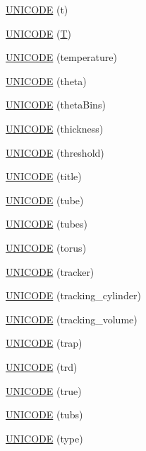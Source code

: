 \begin{DoxyCompactItemize}
\item 
\hyperlink{namespace_d_d4hep_1_1_x_m_l_a988d89cf2c203a2dcab17dcdd2b646e9}{UNICODE} (t)
\item 
\hyperlink{namespace_d_d4hep_1_1_x_m_l_ae77633b9569ec50bee3f73593ec8a980}{UNICODE} (\hyperlink{class_t}{T})
\item 
\hyperlink{namespace_d_d4hep_1_1_x_m_l_aee923e97c96d6ce85da79a35da8fc126}{UNICODE} (temperature)
\item 
\hyperlink{namespace_d_d4hep_1_1_x_m_l_a8b7e23c0e5c06deb75db701712e98cdd}{UNICODE} (theta)
\item 
\hyperlink{namespace_d_d4hep_1_1_x_m_l_a60d1fee6ef14e9212445fa1b817b0651}{UNICODE} (thetaBins)
\item 
\hyperlink{namespace_d_d4hep_1_1_x_m_l_a3ad9b853b7a648c289537417ea181ce7}{UNICODE} (thickness)
\item 
\hyperlink{namespace_d_d4hep_1_1_x_m_l_a43d8619360425e00275ea047bf584f64}{UNICODE} (threshold)
\item 
\hyperlink{namespace_d_d4hep_1_1_x_m_l_a8699fc9c08306eb74b113123266234bb}{UNICODE} (title)
\item 
\hyperlink{namespace_d_d4hep_1_1_x_m_l_a59d5c1db0e628670901c0aff664eb5c1}{UNICODE} (tube)
\item 
\hyperlink{namespace_d_d4hep_1_1_x_m_l_a80b1b709eb536f9107a7c7297b702c80}{UNICODE} (tubes)
\item 
\hyperlink{namespace_d_d4hep_1_1_x_m_l_ade929897d75b8e68deb204d4169fd7d1}{UNICODE} (torus)
\item 
\hyperlink{namespace_d_d4hep_1_1_x_m_l_a34e397188bc5912d25b3e61a232bed57}{UNICODE} (tracker)
\item 
\hyperlink{namespace_d_d4hep_1_1_x_m_l_a89f1fb0984e2823132240fb9d3520b21}{UNICODE} (tracking\_\-cylinder)
\item 
\hyperlink{namespace_d_d4hep_1_1_x_m_l_ab293b8cea7878daa0cdfaefe143e05e5}{UNICODE} (tracking\_\-volume)
\item 
\hyperlink{namespace_d_d4hep_1_1_x_m_l_a8ec122b4dce94b84b3dc3a8ebfb5a1c5}{UNICODE} (trap)
\item 
\hyperlink{namespace_d_d4hep_1_1_x_m_l_ad6ad99ba2edf397c3a1758c2deec0228}{UNICODE} (trd)
\item 
\hyperlink{namespace_d_d4hep_1_1_x_m_l_acb8870e3f346c1088e7754e7e35222e6}{UNICODE} (true)
\item 
\hyperlink{namespace_d_d4hep_1_1_x_m_l_a2135901b4c1064197d7531e166c6c7a1}{UNICODE} (tubs)
\item 
\hyperlink{namespace_d_d4hep_1_1_x_m_l_a4cf4043ff061cf55d8dce92f36341a45}{UNICODE} (type)

\end{DoxyCompactItemize}
